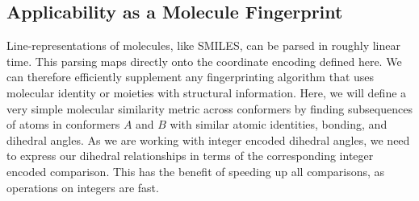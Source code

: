 \documentclass[%
 preprint,
superscriptaddress,
 amsmath,amssymb,
 aip,
 jcp,
]{revtex4-2}
\begin{document}

\subsection{Applicability as a Molecule Fingerprint}

Line-representations of molecules, like SMILES, can be parsed in roughly linear time.
This parsing maps directly onto the coordinate encoding defined here.
We can therefore efficiently supplement any fingerprinting algorithm that uses molecular identity or moieties with structural information.
Here, we will define a very simple molecular similarity metric across conformers by finding subsequences of atoms in conformers $A$ and $B$ with similar atomic identities, bonding, and dihedral angles.
As we are working with integer encoded dihedral angles, we need to express our dihedral relationships in terms of the corresponding integer encoded comparison.
This has the benefit of speeding up all comparisons, as operations on integers are fast.


\end{document}
